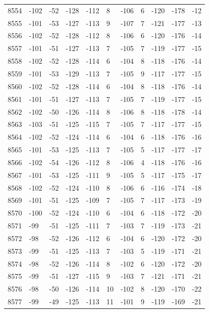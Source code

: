 \begin{table}[H]
\begin{tabular}{lllllllllll}
8554 & -102 & -52 & -128 & -112 & 8 & -106 & 6 & -120 & -178 & -12 \\
8555 & -101 & -53 & -127 & -113 & 9 & -107 & 7 & -121 & -177 & -13 \\
8556 & -102 & -52 & -128 & -112 & 8 & -106 & 6 & -120 & -176 & -14 \\
8557 & -101 & -51 & -127 & -113 & 7 & -105 & 7 & -119 & -177 & -15 \\
8558 & -102 & -52 & -128 & -114 & 6 & -104 & 8 & -118 & -176 & -14 \\
8559 & -101 & -53 & -129 & -113 & 7 & -105 & 9 & -117 & -177 & -15 \\
8560 & -102 & -52 & -128 & -114 & 6 & -104 & 8 & -118 & -176 & -14 \\
8561 & -101 & -51 & -127 & -113 & 7 & -105 & 7 & -119 & -177 & -15 \\
8562 & -102 & -50 & -126 & -114 & 8 & -106 & 8 & -118 & -178 & -14 \\
8563 & -103 & -51 & -125 & -115 & 7 & -105 & 7 & -117 & -177 & -15 \\
8564 & -102 & -52 & -124 & -114 & 6 & -104 & 6 & -118 & -176 & -16 \\
8565 & -101 & -53 & -125 & -113 & 7 & -105 & 5 & -117 & -177 & -17 \\
8566 & -102 & -54 & -126 & -112 & 8 & -106 & 4 & -118 & -176 & -16 \\
8567 & -101 & -53 & -125 & -111 & 9 & -105 & 5 & -117 & -175 & -17 \\
8568 & -102 & -52 & -124 & -110 & 8 & -106 & 6 & -116 & -174 & -18 \\
8569 & -101 & -51 & -125 & -109 & 7 & -105 & 7 & -117 & -173 & -19 \\
8570 & -100 & -52 & -124 & -110 & 6 & -104 & 6 & -118 & -172 & -20 \\
8571 & -99 & -51 & -125 & -111 & 7 & -103 & 7 & -119 & -173 & -21 \\
8572 & -98 & -52 & -126 & -112 & 6 & -104 & 6 & -120 & -172 & -20 \\
8573 & -99 & -51 & -125 & -113 & 7 & -103 & 5 & -119 & -171 & -21 \\
8574 & -98 & -52 & -126 & -114 & 8 & -102 & 6 & -120 & -172 & -20 \\
8575 & -99 & -51 & -127 & -115 & 9 & -103 & 7 & -121 & -171 & -21 \\
8576 & -98 & -50 & -126 & -114 & 10 & -102 & 8 & -120 & -170 & -22 \\
8577 & -99 & -49 & -125 & -113 & 11 & -101 & 9 & -119 & -169 & -21 \\

\end{tabular}
\end{table}
